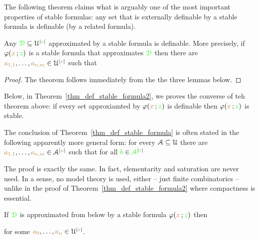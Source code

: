 \documentclass[creche.tex]{subfiles}
\begin{document}
The following theorem claims what is arguably one of the most important properties of stable formulas: any set that is externally definable by a stable formula is definable (by a related formula).

\begin{theorem}\label{thm_def_stable_formula}
Any ${\color{green}\EuScript D}\subseteq\EuScript U^{|{\color{green} z}|}$ approximated by a stable formula is definable.
More precisely, if $\varphi({\color{brown} x}\,;{\color{green} z})$ is a stable formula that approximates ${\color{green}\EuScript D}$ then there are ${\color{brown} a_{1,1}},\dots,{\color{brown} a_{n,m}}\in\EuScript U^{|{\color{brown} x}|}$ such that 

\end{theorem}

\begin{proof}
The theorem follows immediately from the the three lemmas below.
\end{proof}

Below, in Theorem~\ref{thm_def_stable_formula2}, we proves the converse of teh theorem above:  if every set approxiamted by $\varphi({\color{brown} x}\,;{\color{green} z})$ is definable then  $\varphi({\color{brown} x}\,;{\color{green} z})$ is stable.

\begin{remark}\label{rem_sability_no_compactness}
The conclusion of Theorem~\ref{thm_def_stable_formula} is often stated in the following  apparently more general form:
for every $\EuScript A\subseteq\EuScript U$ there are ${\color{brown} a_{1,1}},\dots,{\color{brown} a_{n,m}}\in \EuScript A^{|{\color{brown} x}|}$ such that for all ${\color{green} b}\in{\color{green}\EuScript A}^{|{\color{green} z}|}$


The proof is exactly the same. In fact, elementarity and saturation are never used. In a sense, no model theory is used, either -- just finite combinatorics -- unlike in the proof of Theorem~\ref{thm_def_stable_formula2} where compactness is essential.\QED
\end{remark}

\begin{lemma}
If ${\color{green}\EuScript D}$ is approximated from below by a stable formula $\varphi({\color{brown} x}\,;{\color{green} z})$ then


for some ${\color{brown} a_0},\dots,{\color{brown} a_n}\in\EuScript U^{|{\color{brown} x}|}$. 
\end{lemma}
\end{document}
